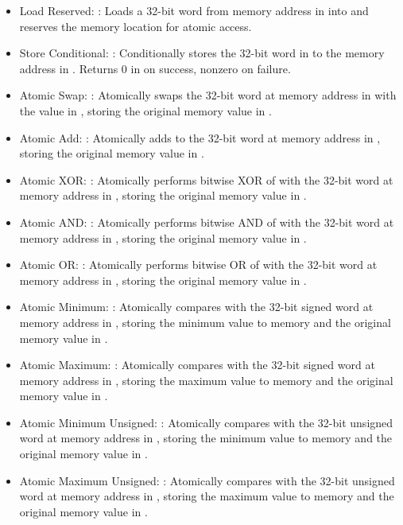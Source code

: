 \documentclass[11pt,pdftex,portrait,letterpaper]{article}
\begin{document}
\begin{itemize}
	\item Load Reserved: : Loads a 32-bit word from memory address in  into  and reserves the memory location for atomic access.
	\item Store Conditional: : Conditionally stores the 32-bit word in  to the memory address in . Returns 0 in  on success, nonzero on failure.
	\item Atomic Swap: : Atomically swaps the 32-bit word at memory address in  with the value in , storing the original memory value in .
	\item Atomic Add: : Atomically adds  to the 32-bit word at memory address in , storing the original memory value in .
	\item Atomic XOR: : Atomically performs bitwise XOR of  with the 32-bit word at memory address in , storing the original memory value in .
	\item Atomic AND: : Atomically performs bitwise AND of  with the 32-bit word at memory address in , storing the original memory value in .
	\item Atomic OR: : Atomically performs bitwise OR of  with the 32-bit word at memory address in , storing the original memory value in .
	\item Atomic Minimum: : Atomically compares  with the 32-bit signed word at memory address in , storing the minimum value to memory and the original memory value in .
	\item Atomic Maximum: : Atomically compares  with the 32-bit signed word at memory address in , storing the maximum value to memory and the original memory value in .
	\item Atomic Minimum Unsigned: : Atomically compares  with the 32-bit unsigned word at memory address in , storing the minimum value to memory and the original memory value in .
	\item Atomic Maximum Unsigned: : Atomically compares  with the 32-bit unsigned word at memory address in , storing the maximum value to memory and the original memory value in .
\end{itemize}
\end{document}
